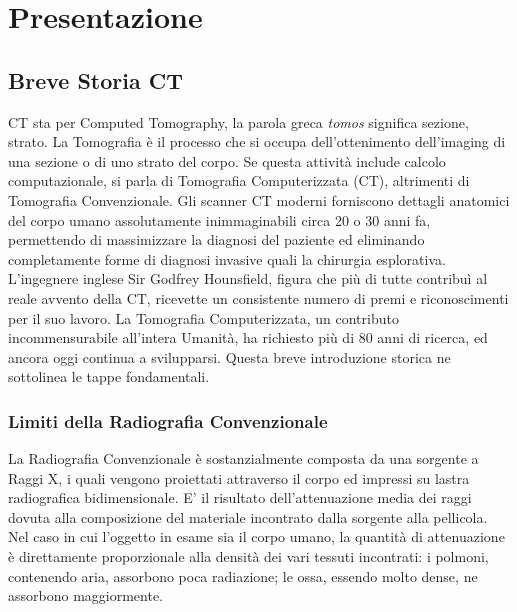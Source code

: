 \documentclass[a4paper,12pt, doubleside]{report}
\begin{document}
    \newpage
    \tableofcontents
    \newpage
    \chapter{Presentazione}
        \section{Breve Storia CT}
            \par
                CT sta per Computed Tomography, la parola greca \textit{tomos} significa sezione, strato. La Tomografia è il processo che si occupa dell'ottenimento dell'imaging di una sezione o di uno strato del corpo. Se questa attività include calcolo computazionale, si parla di Tomografia Computerizzata (CT), altrimenti di Tomografia Convenzionale.
                Gli scanner CT moderni forniscono dettagli anatomici del corpo umano assolutamente inimmaginabili circa 20 o 30 anni fa, permettendo di massimizzare la diagnosi del paziente ed eliminando completamente forme di diagnosi invasive quali la chirurgia esplorativa. L'ingegnere inglese Sir Godfrey Hounsfield, figura che più di tutte contribuì al reale avvento della CT, ricevette un consistente numero di premi e riconoscimenti per il suo lavoro. La Tomografia Computerizzata, un contributo incommensurabile all’intera Umanità, ha richiesto più di 80 anni di ricerca, ed ancora oggi continua a svilupparsi. Questa breve introduzione storica ne sottolinea le tappe fondamentali.
            
            \subsection{Limiti della Radiografia Convenzionale}
                \par
                    La Radiografia Convenzionale è sostanzialmente composta da una sorgente a Raggi X, i quali vengono proiettati attraverso il corpo ed impressi su lastra radiografica bidimensionale. E' il risultato dell’attenuazione media \cite{hounsfield-nobel-lecture} dei raggi dovuta alla composizione del materiale incontrato dalla sorgente alla pellicola. Nel caso in cui l’oggetto in esame sia il corpo umano, la quantità di attenuazione è direttamente proporzionale alla densità dei vari tessuti incontrati: i polmoni, contenendo aria, assorbono poca radiazione; le ossa, essendo molto dense, ne assorbono maggiormente.
                            
\end{document}
